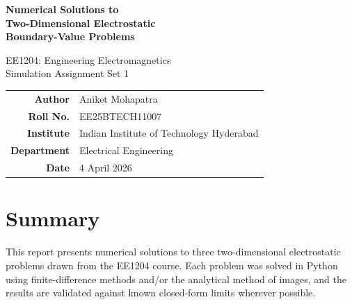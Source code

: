 \documentclass[11pt,a4paper]{article}
\begin{document}
\begin{titlepage}
\centering
\vspace*{3cm}
{\Huge\bfseries Numerical Solutions to\\[4mm]Two-Dimensional Electrostatic\\[4mm]Boundary-Value Problems\par}
\vspace{1.5cm}
{\Large EE1204: Engineering Electromagnetics\\[3mm]Simulation Assignment Set 1\par}
\vspace{2cm}
\begin{tabular}{rl}
\textbf{Author}      & Aniket Mohapatra \\
\textbf{Roll No.}    & EE25BTECH11007 \\
\textbf{Institute}   & Indian Institute of Technology Hyderabad \\
\textbf{Department}  & Electrical Engineering \\
\textbf{Date}        & 4 April 2026 \\
\end{tabular}
\vspace{1.5cm}


\noindent{}
\end{titlepage}

\tableofcontents
\newpage

\section*{Summary}

This report presents numerical solutions to three two-dimensional electrostatic problems drawn from the EE1204 course. Each problem was solved in Python using finite-difference methods and/or the analytical method of images, and the results are validated against known closed-form limits wherever possible.
\end{document}
